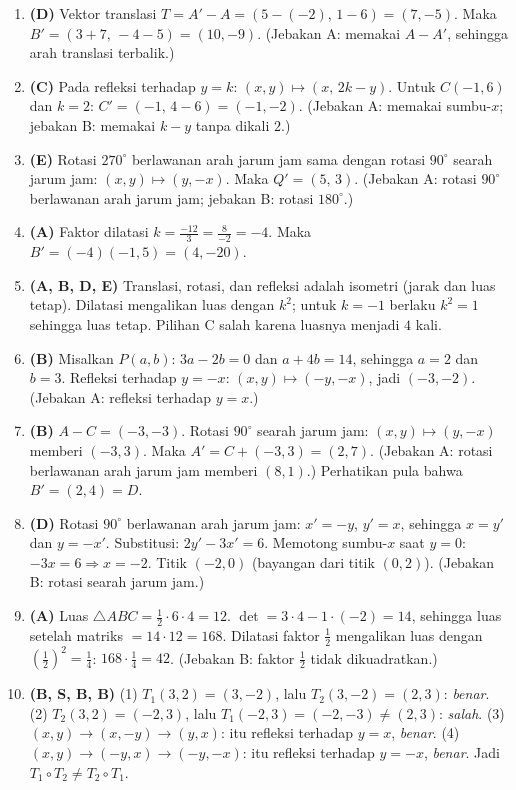 \documentclass[a4paper,11pt]{article}
\begin{document}
\small\begin{enumerate}[leftmargin=2em,itemsep=2pt,topsep=2pt]
\item[\textbf{1.}] \textbf{(D)} Vektor translasi $T=A'-A=(5-(-2),\,1-6)=(7,-5)$. Maka $B'=(3+7,\,-4-5)=(10,-9)$. (Jebakan A: memakai $A-A'$, sehingga arah translasi terbalik.)
\item[\textbf{2.}] \textbf{(C)} Pada refleksi terhadap $y=k$: $(x,y)\mapsto(x,\,2k-y)$. Untuk $C(-1,6)$ dan $k=2$: $C'=(-1,\,4-6)=(-1,-2)$. (Jebakan A: memakai sumbu-$x$; jebakan B: memakai $k-y$ tanpa dikali $2$.)
\item[\textbf{3.}] \textbf{(E)} Rotasi $270^\circ$ berlawanan arah jarum jam sama dengan rotasi $90^\circ$ searah jarum jam: $(x,y)\mapsto(y,-x)$. Maka $Q'=(5,\,3)$. (Jebakan A: rotasi $90^\circ$ berlawanan arah jarum jam; jebakan B: rotasi $180^\circ$.)
\item[\textbf{4.}] \textbf{(A)} Faktor dilatasi $k=\frac{-12}{3}=\frac{8}{-2}=-4$. Maka $B'=(-4)(-1,5)=(4,-20)$.
\item[\textbf{5.}] \textbf{(A, B, D, E)} Translasi, rotasi, dan refleksi adalah isometri (jarak dan luas tetap). Dilatasi mengalikan luas dengan $k^2$; untuk $k=-1$ berlaku $k^2=1$ sehingga luas tetap. Pilihan C salah karena luasnya menjadi $4$ kali.
\item[\textbf{6.}] \textbf{(B)} Misalkan $P(a,b)$: $3a-2b=0$ dan $a+4b=14$, sehingga $a=2$ dan $b=3$. Refleksi terhadap $y=-x$: $(x,y)\mapsto(-y,-x)$, jadi $(-3,-2)$. (Jebakan A: refleksi terhadap $y=x$.)
\item[\textbf{7.}] \textbf{(B)} $A-C=(-3,-3)$. Rotasi $90^\circ$ searah jarum jam: $(x,y)\mapsto(y,-x)$ memberi $(-3,3)$. Maka $A'=C+(-3,3)=(2,7)$. (Jebakan A: rotasi berlawanan arah jarum jam memberi $(8,1)$.) Perhatikan pula bahwa $B'=(2,4)=D$.
\item[\textbf{8.}] \textbf{(D)} Rotasi $90^\circ$ berlawanan arah jarum jam: $x'=-y$, $y'=x$, sehingga $x=y'$ dan $y=-x'$. Substitusi: $2y'-3x'=6$. Memotong sumbu-$x$ saat $y=0$: $-3x=6\Rightarrow x=-2$. Titik $(-2,0)$ (bayangan dari titik $(0,2)$). (Jebakan B: rotasi searah jarum jam.)
\item[\textbf{9}.] \textbf{(A)} Luas $\triangle ABC=\frac12\cdot6\cdot4=12$. $\det=3\cdot4-1\cdot(-2)=14$, sehingga luas setelah matriks $=14\cdot12=168$. Dilatasi faktor $\frac12$ mengalikan luas dengan $\left(\frac12\right)^2=\frac14$: $168\cdot\frac14=42$. (Jebakan B: faktor $\frac12$ tidak dikuadratkan.)
\item[\textbf{10.}] \textbf{(B, S, B, B)} (1) $T_1(3,2)=(3,-2)$, lalu $T_2(3,-2)=(2,3)$: \emph{benar}. (2) $T_2(3,2)=(-2,3)$, lalu $T_1(-2,3)=(-2,-3)\neq(2,3)$: \emph{salah}. (3) $(x,y)\to(x,-y)\to(y,x)$: itu refleksi terhadap $y=x$, \emph{benar}. (4) $(x,y)\to(-y,x)\to(-y,-x)$: itu refleksi terhadap $y=-x$, \emph{benar}. Jadi $T_1\circ T_2\neq T_2\circ T_1$.

\end{enumerate}
\end{document}
